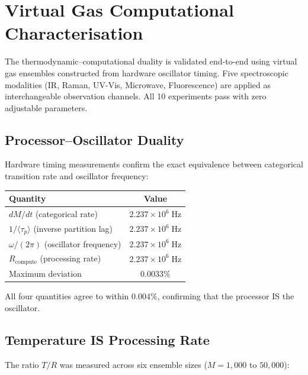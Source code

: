 \documentclass[twocolumn,10pt,a4paper]{article}
\theoremstyle{plain}
\theoremstyle{definition}
\theoremstyle{remark}
\begin{document}
\section{Virtual Gas Computational Characterisation}
\label{sec:val_virtual}

The thermodynamic--computational duality is validated end-to-end using virtual gas ensembles constructed from hardware oscillator timing. Five spectroscopic modalities (IR, Raman, UV-Vis, Microwave, Fluorescence) are applied as interchangeable observation channels. All 10 experiments pass with zero adjustable parameters.

\subsection{Processor--Oscillator Duality}

Hardware timing measurements confirm the exact equivalence between categorical transition rate and oscillator frequency:

\begin{center}
\begin{tabular}{lc}
\toprule
Quantity & Value \\
\midrule
$dM/dt$ (categorical rate) & $2.237 \times 10^6\;\mathrm{Hz}$ \\
$1/\langle\tau_p\rangle$ (inverse partition lag) & $2.237 \times 10^6\;\mathrm{Hz}$ \\
$\omega/(2\pi)$ (oscillator frequency) & $2.237 \times 10^6\;\mathrm{Hz}$ \\
$R_{\mathrm{compute}}$ (processing rate) & $2.237 \times 10^6\;\mathrm{Hz}$ \\
\midrule
Maximum deviation & $0.0033\%$ \\
\bottomrule
\end{tabular}
\end{center}

All four quantities agree to within $0.004\%$, confirming that the processor IS the oscillator.

\subsection{Temperature IS Processing Rate}

The ratio $T/R$ was measured across six ensemble sizes ($M = 1{,}000$ to $50{,}000$):
\end{document}
